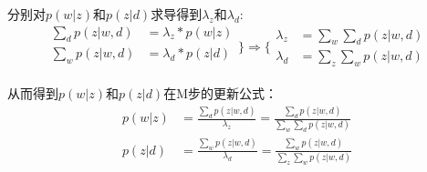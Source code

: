 分别对$p(w|z)$和$p(z|d)$求导得到$\lambda_z$和$\lambda_d$:
\begin{displaymath}
\begin{aligned}
\sum_d{p(z|w,d)} &= \lambda_z*p(w|z)\\
\sum_w{p(z|w,d)} &= \lambda_d*p(z|d)\\
\end{aligned} \} \Longrightarrow
\{
\begin{aligned}
\lambda_z &= \sum_w{\sum_d{p(z|w,d)}}\\
\lambda_d &= \sum_z{\sum_w{p(z|w,d)}}
\end{aligned}
\end{displaymath} 

从而得到$p(w|z)$和$p(z|d)$在M步的更新公式：
\begin{displaymath}
\begin{split}
p(w|z) &= \frac{\sum_d{p(z|w,d)}}{\lambda_z}
=\frac{
          \sum_d{p(z|w,d)}
        }{
           \sum_w{
                 \sum_d{p(z|w,d)}
                }
        }\\
p(z|d) &= \frac{\sum_w{p(z|w,d)}}{\lambda_d}
= \frac{\sum_w{p(z|w,d)}}{\sum_z{\sum_w{p(z|w,d)}}}
\end{split}
\end{displaymath} 


